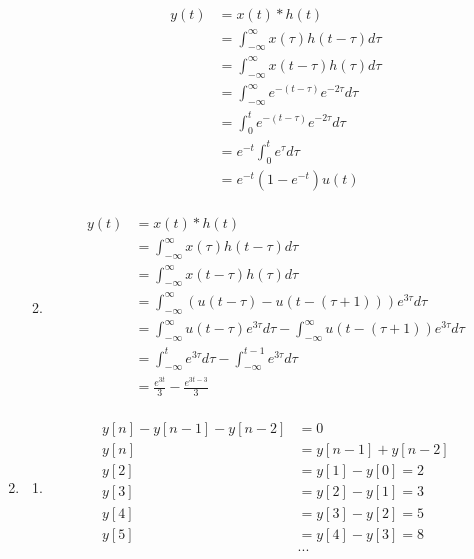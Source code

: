 \documentclass[10pt,a4paper, margin=1in]{article}
\begin{document}
\begin{enumerate}
\begin{enumerate}

    \begin{align*}
        y(t) & = x(t) * h(t) \\
        & = \int_{-\infty}^{\infty} x(\tau) h(t - \tau) d\tau \\
        & = \int_{-\infty}^{\infty} x(t - \tau) h(\tau) d\tau \\
        & = \int_{-\infty}^{\infty} e^{-(t - \tau)} e^{-2\tau} d\tau \\
        & = \int_{0}^{t} e^{-(t - \tau)} e^{-2\tau} d\tau \\
        & = e^{-t} \int_{0}^{t} e^{\tau} d\tau \\
        & = e^{-t} \left(1 - e^{-t}\right)u(t) \\
    \end{align*}
    \item %
    \begin{align*}
        y(t) & = x(t) * h(t) \\
        & = \int_{-\infty}^{\infty} x(\tau) h(t - \tau) d\tau \\
        & = \int_{-\infty}^{\infty} x(t - \tau) h(\tau) d\tau \\
        & = \int_{-\infty}^{\infty} \left(u(t - \tau) - u(t - (\tau + 1))\right) e^{3\tau} d\tau \\
        & = \int_{-\infty}^{\infty} u(t - \tau) e^{3\tau} d\tau - \int_{-\infty}^{\infty} u(t - (\tau + 1)) e^{3\tau} d\tau \\
        & = \int_{-\infty}^{t} e^{3\tau} d\tau - \int_{-\infty}^{t - 1} e^{3\tau} d\tau \\
        & = \frac{e^{3t}}{3} - \frac{e^{3t - 3}}{3}\\
    \end{align*}
    \end{enumerate}

\item %
    \begin{enumerate}   
    \item %
    \begin{align*}
        y[n] - y[n - 1] - y[n - 2] & = 0\\
        y[n] & = y[n - 1] + y[n - 2]\\
        y[2] & = y[1] - y[0] = 2\\
        y[3] & = y[2] - y[1] = 3\\
        y[4] & = y[3] - y[2] = 5\\
        y[5] & = y[4] - y[3] = 8\\
        & ... \\
    \end{align*}


\end{enumerate}
\end{enumerate}
\end{document}
